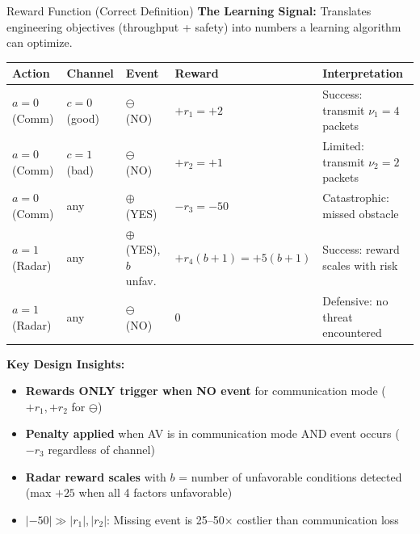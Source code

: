 \documentclass{beamer}
\begin{document}
\begin{frame}{Reward Function (Correct Definition)}
  \textbf{The Learning Signal:} Translates engineering objectives (throughput + safety) into numbers a learning algorithm can optimize.

  \vspace{0.1cm}
  \scriptsize
  \begin{tabular}{|p{1.2cm}|p{1.4cm}|p{1.6cm}|p{1.0cm}|p{2.6cm}|}
    \hline
    \textbf{Action} & \textbf{Channel} & \textbf{Event} & \textbf{Reward} & \textbf{Interpretation} \\
    \hline
    $a=0$ (Comm) & $c=0$ (good) & $\ominus$ (NO) & $+r_1 = +2$ & Success: transmit $\nu_1=4$ packets \\
    \hline
    $a=0$ (Comm) & $c=1$ (bad) & $\ominus$ (NO) & $+r_2 = +1$ & Limited: transmit $\nu_2=2$ packets \\
    \hline
    $a=0$ (Comm) & any & $\oplus$ (YES) & $-r_3 = -50$ & Catastrophic: missed obstacle \\
    \hline
    $a=1$ (Radar) & any & $\oplus$ (YES), $b$ unfav. & $+r_4(b+1) = +5(b+1)$ & Success: reward scales with risk \\
    \hline
    $a=1$ (Radar) & any & $\ominus$ (NO) & $0$ & Defensive: no threat encountered \\
    \hline
  \end{tabular}

  \normalsize
  \vspace{0.1cm}
  \small\textbf{Key Design Insights:}
  \begin{itemize}
    \setlength{\itemsep}{0.05cm}
    \item \textbf{Rewards ONLY trigger when NO event} for communication mode ($+r_1, +r_2$ for $\ominus$)
    \item \textbf{Penalty applied} when AV is in communication mode AND event occurs ($-r_3$ regardless of channel)
    \item \textbf{Radar reward scales} with $b$ = number of unfavorable conditions detected (max $+25$ when all 4 factors unfavorable)
    \item $|-50| \gg |r_1|, |r_2|$: Missing event is 25--50× costlier than communication loss
  \end{itemize}

  \normalsize
\end{frame}
\end{document}
